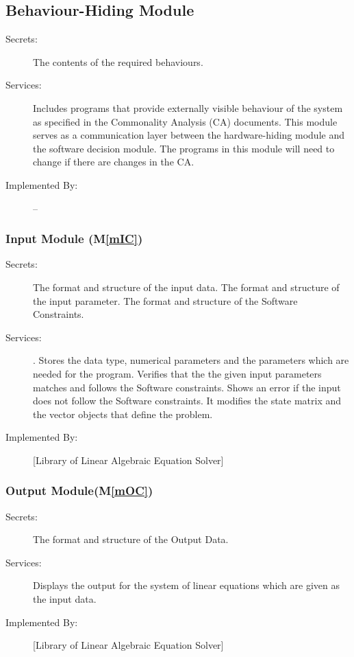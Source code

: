\documentclass[12pt, titlepage]{article}
\newcommand{\mref}[1]{M\ref{#1}}
\begin{document}
\subsection{Behaviour-Hiding Module}

\begin{description}
\item[Secrets:]The contents of the required behaviours.
\item[Services:]Includes programs that provide externally visible behaviour of
  the system as specified in the Commonality Analysis (CA)
  documents. This module serves as a communication layer between the
  hardware-hiding module and the software decision module. The programs in this
  module will need to change if there are changes in the CA.
\item[Implemented By:] --
\end{description}

\subsubsection{Input Module (\mref{mIC})}

\begin{description}
\item[Secrets:]The format and structure of the input data. The format and structure of the input parameter. The format and structure of the Software Constraints.
\item[Services:]. Stores the data type, numerical parameters and the parameters which are needed for the program. Verifies that the the given input parameters matches and follows the Software constraints. Shows an error if the input does not follow the Software constraints. It modifies the state matrix and the vector objects that define the problem. 
\item[Implemented By:] [Library of Linear Algebraic Equation Solver]
\end{description}



\subsubsection{Output Module(\mref{mOC})}

\begin{description}
\item[Secrets:]The format and structure of the Output Data.
\item[Services:]Displays the output for the system of linear equations which are given as the input data.
\item[Implemented By:] [Library of Linear Algebraic Equation Solver]
\end{description}
\end{document}
